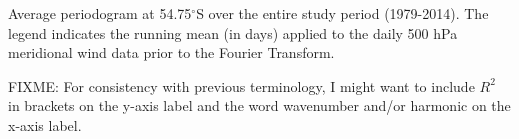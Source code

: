 \label{fig:fourier_spectrum}
Average periodogram at 54.75$^{\circ}$S over the entire study period (1979-2014). The legend indicates the running mean (in days) applied to the daily 500 hPa meridional wind data prior to the Fourier Transform. 

FIXME: For consistency with previous terminology, I might want to include $R^2$ in brackets on the y-axis label and the word wavenumber and/or harmonic on the x-axis label.